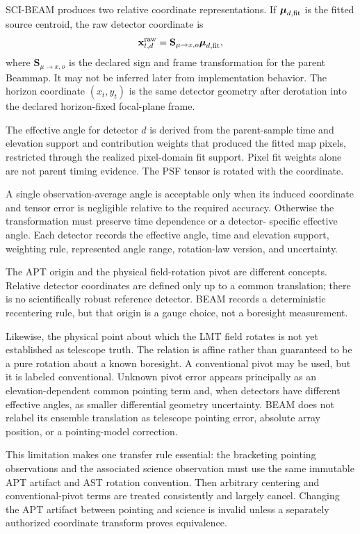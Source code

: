 \documentclass[11pt]{article}
\begin{document}
SCI-BEAM produces two relative coordinate representations. If
$\boldsymbol\mu_{d,\rm fit}$ is the fitted source centroid, the raw detector
coordinate is
\begin{equation}
\mathbf x^{\rm raw}_{t,d}=
\mathbf S_{\mu\rightarrow x,o}\boldsymbol\mu_{d,\rm fit},
\label{eq:rationale-centroid-sign}
\end{equation}
where $\mathbf S_{\mu\rightarrow x,o}$ is the declared sign and frame
transformation for the parent Beammap. It may not be inferred later from
implementation behavior. The horizon coordinate $(x_t,y_t)$ is the same
detector geometry after derotation into the declared horizon-fixed focal-plane
frame.

The effective angle for detector $d$ is derived from the parent-sample time
and elevation support and contribution weights that produced the fitted map
pixels, restricted through the realized pixel-domain fit support. Pixel fit
weights alone are not parent timing evidence. The PSF tensor is rotated with
the coordinate.

A single observation-average angle is acceptable only when its induced
coordinate and tensor error is negligible relative to the required accuracy.
Otherwise the transformation must preserve time dependence or a detector-
specific effective angle. Each detector records the effective angle, time and
elevation support, weighting rule, represented angle range, rotation-law
version, and uncertainty.

The APT origin and the physical field-rotation pivot are different concepts.
Relative detector coordinates are defined only up to a common translation;
there is no scientifically robust reference detector. BEAM records a
deterministic recentering rule, but that origin is a gauge choice, not a
boresight measurement.

Likewise, the physical point about which the LMT field rotates is not yet
established as telescope truth. The relation is affine rather than guaranteed
to be a pure rotation about a known boresight. A conventional pivot may be
used, but it is labeled conventional. Unknown pivot error appears principally
as an elevation-dependent common pointing term and, when detectors have
different effective angles, as smaller differential geometry uncertainty.
BEAM does not relabel its ensemble translation as telescope pointing error,
absolute array position, or a pointing-model correction.

This limitation makes one transfer rule essential: the bracketing pointing
observations and the associated science observation must use the same
immutable APT artifact and AST rotation convention. Then arbitrary centering
and conventional-pivot terms are treated consistently and largely cancel.
Changing the APT artifact between pointing and science is invalid unless a
separately authorized coordinate transform proves equivalence.
\end{document}
